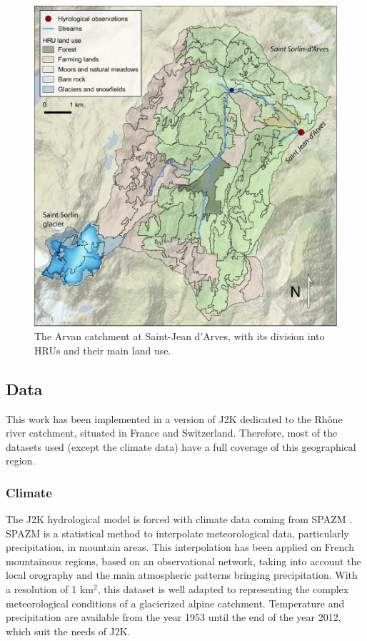 \begin{figure}[h]
\centering
\includegraphics[width=12cm]{Figures/hydro/Figure_2.pdf}
\caption{The Arvan catchment at Saint-Jean d'Arves, with its division into HRUs and their main land use. } 
\label{hydro:fig1}
\end{figure}

\subsection{Data}

This work has been implemented in a version of J2K dedicated to the Rhône river catchment, situated in France and Switzerland. Therefore, most of the datasets used (except the climate data) have a full coverage of this geographical region.

\subsubsection{Climate}

The J2K hydrological model is forced with climate data coming from SPAZM \citep{gottardi_statistical_2012}. SPAZM is a statistical method to interpolate meteorological data, particularly precipitation, in mountain areas. This interpolation has been applied on French mountainous regions, based on an observational network, taking into account the local orography and the main atmospheric patterns bringing precipitation. With a resolution of 1 km$^{2}$, this dataset is well adapted to representing the complex meteorological conditions of a glacierized alpine catchment. Temperature and precipitation are available from the year 1953 until the end of the year 2012, which suit the needs of J2K.


